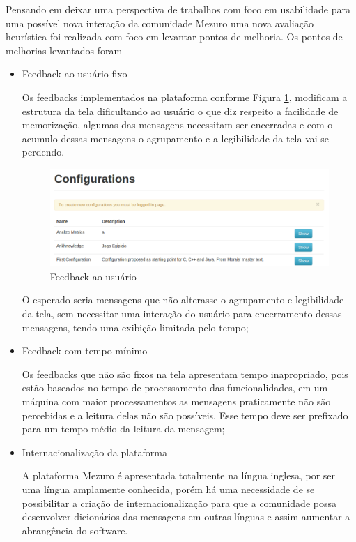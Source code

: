 Pensando em deixar uma perspectiva de trabalhos com foco em usabilidade para uma possível nova interação da comunidade Mezuro uma nova avaliação heurística foi realizada com foco em levantar pontos de melhoria. Os pontos de melhorias levantados foram
\begin{itemize}
\item Feedback ao usuário fixo

Os feedbacks implementados na plataforma conforme Figura \ref{feedback}, modificam a estrutura da tela dificultando ao usuário o que diz respeito a facilidade de memorização, algumas das mensagens necessitam ser encerradas e com o acumulo dessas mensagens o agrupamento e a legibilidade da tela vai se perdendo.

\graphicspath{{figuras/}}
\begin{figure}[h]
\centering
\includegraphics[width=1.0\textwidth]{FeedBack}
\caption{Feedback ao usuário}
\label{feedback}
\end{figure}

O esperado seria mensagens que não alterasse o agrupamento e legibilidade da tela, sem necessitar uma interação do usuário para encerramento dessas mensagens, tendo uma exibição limitada pelo tempo;

\item Feedback com tempo mínimo 

Os feedbacks que não são fixos na tela apresentam tempo inapropriado, pois estão baseados no tempo de processamento das funcionalidades, em um máquina com maior processamentos as mensagens praticamente não são percebidas e a leitura delas não são possíveis. Esse tempo deve ser prefixado para um tempo médio da leitura da mensagem;

\item Internacionalização da plataforma

A plataforma Mezuro é apresentada totalmente na língua inglesa, por ser uma língua amplamente conhecida, porém há uma necessidade de se possibilitar a criação de internacionalização para que a comunidade possa desenvolver dicionários das mensagens em outras línguas e assim aumentar a abrangência do software.

\end{itemize}

